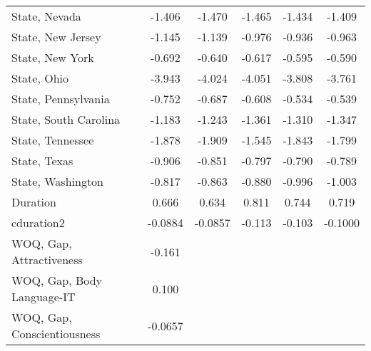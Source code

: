 {\begin{tabular}{l*{5}{c}}
\addlinespace
State, Nevada            &      -1.406         &      -1.470         &      -1.465         &      -1.434         &      -1.409         \\
\addlinespace
State, New Jersey        &      -1.145         &      -1.139         &      -0.976         &      -0.936         &      -0.963         \\
\addlinespace
State, New York          &      -0.692\sym{**} &      -0.640\sym{*}  &      -0.617\sym{*}  &      -0.595\sym{*}  &      -0.590\sym{*}  \\
\addlinespace
State, Ohio              &      -3.943\sym{***}&      -4.024\sym{***}&      -4.051\sym{***}&      -3.808\sym{***}&      -3.761\sym{***}\\
\addlinespace
State, Pennsylvania      &      -0.752         &      -0.687         &      -0.608         &      -0.534         &      -0.539         \\
\addlinespace
State, South Carolina    &      -1.183         &      -1.243         &      -1.361         &      -1.310         &      -1.347         \\
\addlinespace
State, Tennessee         &      -1.878\sym{**} &      -1.909\sym{**} &      -1.545\sym{*}  &      -1.843\sym{**} &      -1.799\sym{**} \\
\addlinespace
State, Texas             &      -0.906\sym{**} &      -0.851\sym{**} &      -0.797\sym{**} &      -0.790\sym{**} &      -0.789\sym{**} \\
\addlinespace
State, Washington        &      -0.817         &      -0.863\sym{*}  &      -0.880\sym{*}  &      -0.996\sym{**} &      -1.003\sym{**} \\
\addlinespace
Duration                 &       0.666\sym{**} &       0.634\sym{**} &       0.811\sym{***}&       0.744\sym{**} &       0.719\sym{**} \\
\addlinespace
cduration2               &     -0.0884\sym{**} &     -0.0857\sym{**} &      -0.113\sym{***}&      -0.103\sym{**} &     -0.1000\sym{**} \\
\addlinespace
WOQ, Gap, Attractiveness &      -0.161\sym{***}&                     &                     &                     &                     \\
\addlinespace
WOQ, Gap, Body Language-IT&       0.100         &                     &                     &                     &                     \\
\addlinespace
WOQ, Gap, Conscientiousness&     -0.0657         &                     &                     &                     &                     \\

\end{tabular}}
